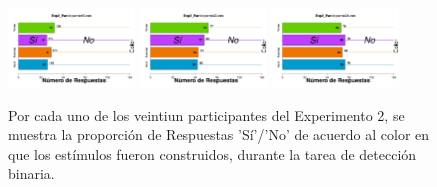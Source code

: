 \begin{figure}[th]
\includegraphics[width=0.30\textwidth]{Figures/BiasColor_Exp2_P19} \includegraphics[width=0.30\textwidth]{Figures/BiasColor_Exp2_P20} \includegraphics[width=0.30\textwidth]{Figures/BiasColor_Exp2_P21} 
\caption[Proporción de Respuestas Sí/No por Color; Experimento 2]{Por cada uno de los veintiun participantes del Experimento 2, se muestra la proporción de Respuestas 'Sí'/'No' de acuerdo al color en que los estímulos fueron construidos, durante la tarea de detección binaria.}
\label{fig:BiasColor_E2}
\end{figure}








